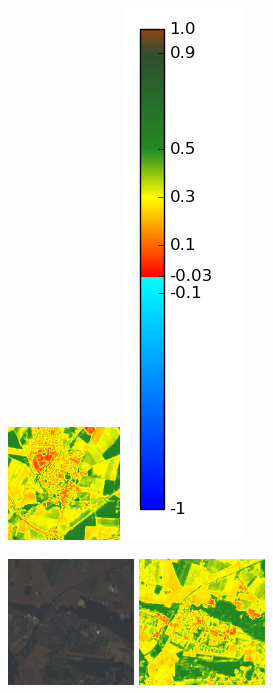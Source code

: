 \documentclass{book}
\begin{document}
\begin{figure}[H]
{\includegraphics[scale=0.9]{images/Louvres/07_ndvi.png}
\includegraphics[scale=0.3]{images/colormap.png}
}
\centerline{
\includegraphics[scale=0.9]{images/Limours/07_rgb.png}
\includegraphics[scale=0.9]{images/Limours/07_ndvi.png}
}
\end{figure}
\end{document}
